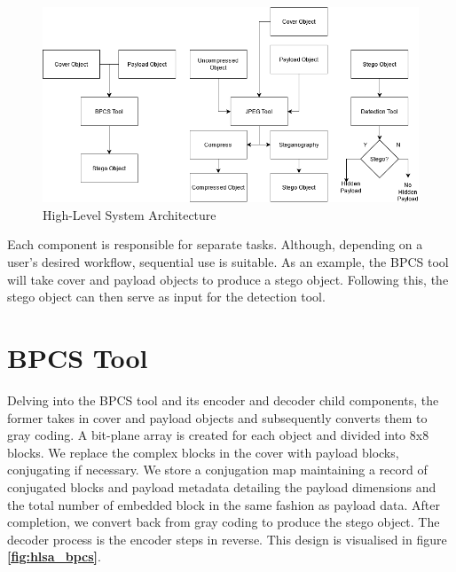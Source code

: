 \documentclass{l4proj}
\begin{document}
\begin{figure}[!h]
    \centering
    \includegraphics[width=1.0\linewidth]{images/system_architecture.png}    
    \caption{High-Level System Architecture}
    \label{fig:hlsa} 
\end{figure}

Each component is responsible for separate tasks. Although, depending on a user's desired workflow, sequential use is suitable. As an example, the BPCS tool will take cover and payload objects to produce a stego object. Following this, the stego object can then serve as input for the detection tool.

\section{BPCS Tool} \label{bpcs_design}

Delving into the BPCS tool and its encoder and decoder child components, the former takes in cover and payload objects and subsequently converts them to gray coding. A bit-plane array is created for each object and divided into 8x8 blocks. We replace the complex blocks in the cover with payload blocks, conjugating if necessary. We store a conjugation map maintaining a record of conjugated blocks and payload metadata detailing the payload dimensions and the total number of embedded block in the same fashion as payload data. After completion, we convert back from gray coding to produce the stego object. The decoder process is the encoder steps in reverse. This design is visualised in figure \textbf{\ref{fig:hlsa_bpcs}}.
\end{document}
